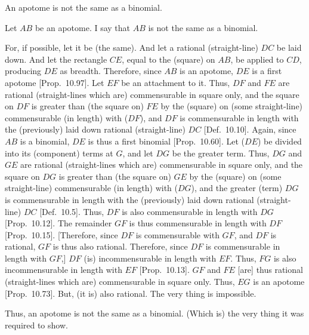 \begin{Parallel}{}{}
{An apotome is not the same as a binomial.

\epsfysize=2.4in
\centerline{}

Let $AB$ be an apotome. I say that $AB$ is not the same as a binomial.

For, if possible, let it be (the same). And let a rational (straight-line)
$DC$ be laid down. And let the rectangle $CE$, equal to the (square) on $AB$, be applied to $CD$, producing $DE$ as breadth. Therefore,
since $AB$ is an apotome, $DE$ is a first apotome [Prop.~10.97]. Let $EF$ be an attachment to it.
Thus, $DF$ and $FE$ are rational (straight-lines which are) commensurable
in square only, and the square on $DF$ is greater than (the square on)
$FE$ by the (square) on (some straight-line) commensurable (in length)
with ($DF$), and $DF$ is commensurable in length with the (previously)
laid down rational (straight-line) $DC$ [Def.~10.10]. 
Again, since $AB$ is a binomial, $DE$ is thus a first binomial [Prop.~10.60]. Let ($DE$) be divided
into its (component) terms at $G$, and let $DG$ be the greater term.
Thus, $DG$ and $GE$ are rational (straight-lines which are)
commensurable in square only, and the square on $DG$ is greater
than (the square on) $GE$ by the (square) on (some straight-line)
commensurable (in length) with ($DG$), and the greater (term)
$DG$ is commensurable in length with the (previously)
laid down rational (straight-line) $DC$ [Def.~10.5].
Thus, $DF$ is also commensurable in length with $DG$ [Prop.~10.12].
The remainder $GF$ is thus commensurable in length with $DF$
[Prop.~10.15]. [Therefore, since
$DF$ is commensurable with $GF$, and $DF$ is rational, $GF$
is thus also rational. Therefore, since $DF$ is commensurable
in length with $GF$,] $DF$ (is) incommensurable in length with $EF$.
Thus, $FG$ is also incommensurable in length with $EF$ [Prop.~10.13]. $GF$ and $FE$ [are] thus
rational (straight-lines which are) commensurable in square only.
Thus, $EG$ is an apotome [Prop.~10.73].
But, (it is) also rational. The very thing is impossible.

Thus, an apotome is not the same as a binomial. (Which is) the very thing
it was required to show.}
\end{Parallel}

